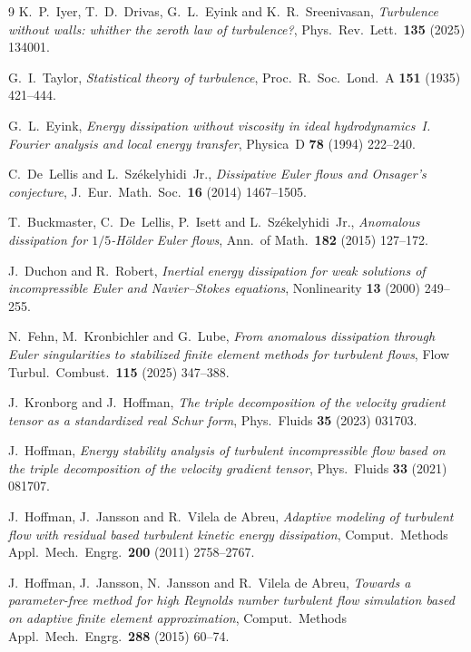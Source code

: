 \documentclass[11pt]{article}
\begin{document}
\begin{thebibliography}{9}
 K.~P.~Iyer, T.~D.~Drivas, G.~L.~Eyink and K.~R.~Sreenivasan, \emph{Turbulence without
walls: whither the zeroth law of turbulence?}, Phys.\ Rev.\ Lett.\ \textbf{135} (2025) 134001.

 G.~I.~Taylor, \emph{Statistical theory of turbulence}, Proc.\ R.\ Soc.\ Lond.\ A
\textbf{151} (1935) 421--444.

 G.~L.~Eyink, \emph{Energy dissipation without viscosity in ideal hydrodynamics~I.
Fourier analysis and local energy transfer}, Physica~D \textbf{78} (1994) 222--240.

 C.~De~Lellis and L.~Sz\'ekelyhidi~Jr., \emph{Dissipative Euler flows and Onsager's
conjecture}, J.\ Eur.\ Math.\ Soc.\ \textbf{16} (2014) 1467--1505.

 T.~Buckmaster, C.~De~Lellis, P.~Isett and L.~Sz\'ekelyhidi~Jr., \emph{Anomalous
dissipation for $1/5$-H\"older Euler flows}, Ann.\ of Math.\ \textbf{182} (2015) 127--172.

 J.~Duchon and R.~Robert, \emph{Inertial energy dissipation for weak solutions
of incompressible Euler and Navier--Stokes equations}, Nonlinearity \textbf{13} (2000) 249--255.

 N.~Fehn, M.~Kronbichler and G.~Lube, \emph{From anomalous dissipation through Euler
singularities to stabilized finite element methods for turbulent flows}, Flow Turbul.\ Combust.\
\textbf{115} (2025) 347--388.

 J.~Kronborg and J.~Hoffman, \emph{The triple decomposition of the velocity gradient
tensor as a standardized real Schur form}, Phys.\ Fluids \textbf{35} (2023) 031703.

 J.~Hoffman, \emph{Energy stability analysis of turbulent incompressible flow based
on the triple decomposition of the velocity gradient tensor}, Phys.\ Fluids \textbf{33} (2021) 081707.

 J.~Hoffman, J.~Jansson and R.~Vilela de Abreu, \emph{Adaptive modeling of turbulent
flow with residual based turbulent kinetic energy dissipation}, Comput.\ Methods Appl.\ Mech.\
Engrg.\ \textbf{200} (2011) 2758--2767.

 J.~Hoffman, J.~Jansson, N.~Jansson and R.~Vilela de Abreu, \emph{Towards a
parameter-free method for high Reynolds number turbulent flow simulation based on adaptive finite
element approximation}, Comput.\ Methods Appl.\ Mech.\ Engrg.\ \textbf{288} (2015) 60--74.


\end{thebibliography}
\end{document}
